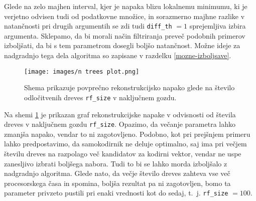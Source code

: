 \documentclass[12pt,a4paper,twoside]{article}
\theoremstyle{definition} %
\theoremstyle{plain} %
\numberwithin{equation}{section}  %
\begin{document}
Glede na zelo majhen interval, kjer je napaka blizu lokalnemu minimumu, ki je verjetno odvisen tudi od podatkovne množice, in sorazmerno majhne razlike v natančnosti pri drugih argumentih se zdi tudi \texttt{diff\_th} $=1$ sprejemljiva izbira argumenta.
Sklepamo, da bi morali način filtriranja preveč podobnih primerov izboljšati, da bi s tem parametrom dosegli boljšo natančnost.
Možne ideje za nadgradnjo tega dela algoritma so zapisane v razdelku \ref{mozne-izboljsave}.





\begin{figure}[h]
	\centering
	\texttt{[image: images/n trees plot.png]}
	\caption[Graf natančnosti glede na \texttt{rf\_size}]{Shema prikazuje povprečno rekonstrukcijsko napako glede na število odločitvenih dreves \texttt{rf\_size} v naključnem gozdu.}
	\label{fig:n_trees}
\end{figure}


Na shemi \ref{fig:n_trees} je prikazan graf rekonstrukcijske napake v odvisnosti od števila dreves v naključnem gozdu \texttt{rf\_size}.
Opazimo, da večanje parametra lahko zmanjša napako, vendar to ni zagotovljeno.
Podobno, kot pri prejšnjem primeru lahko predpostavimo, da samokodirnik ne deluje optimalno, saj ima pri večjem številu dreves na razpolago več kandidatov za kodirni vektor, vendar ne uspe zanesljivo izbrati boljšega nabora.
Tudi to bi se lahko morda izboljšalo z nadgradnjo algoritma.
Glede nato, da večje število dreves zahteva vse več procesorskega časa in spomina, boljša rezultat pa ni zagotovljen, bomo ta parameter privzeto pustili pri enaki vrednosti kot do sedaj, t.~j. \texttt{rf\_size} $=100$.
\end{document}
